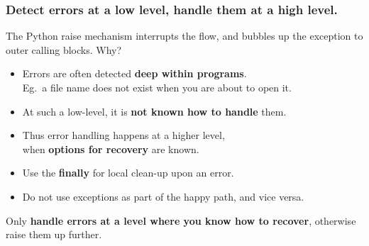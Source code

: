 \documentclass{beamer} %
\newcommand\emc[1]{\textcolor{brightblue}{\textbf{#1}}}
\begin{document}
\begin{frame}
\frametitle{Detect errors at a low level, handle them at a high level.}

The Python raise mechanism interrupts the flow, and bubbles up the exception to outer calling blocks. Why?
\begin{itemize}
\item Errors are often detected \emc{deep within programs}. \\ Eg.\ a file name does not exist when you are about to open it.
\item At such a low-level, it is \emc{not known how to handle} them.
\item Thus error handling happens at a higher level, \\ when \emc{options for recovery} are known.
\item Use the \emc{finally} for local clean-up upon an error.
\item Do not use exceptions as part of the happy path, and vice versa.
\end{itemize}

\vspace{3mm}
Only \emc{handle errors at a level where you know how to recover}, otherwise raise them up further.

\end{frame}


\end{document}
